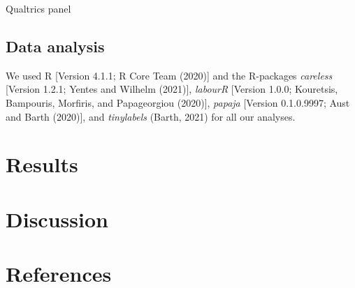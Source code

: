 \documentclass[
  english,
  man]{apa6}
\begin{document}
Qualtrics panel

\hypertarget{data-analysis}{%
\subsection{Data analysis}\label{data-analysis}}

We used R {[}Version 4.1.1; R Core Team (2020){]} and the R-packages \emph{careless} {[}Version 1.2.1; Yentes and Wilhelm (2021){]}, \emph{labourR} {[}Version 1.0.0; Kouretsis, Bampouris, Morfiris, and Papageorgiou (2020){]}, \emph{papaja} {[}Version 0.1.0.9997; Aust and Barth (2020){]}, and \emph{tinylabels} (Barth, 2021) for all our analyses.

\hypertarget{results-1}{%
\section{Results}\label{results-1}}

\hypertarget{discussion-1}{%
\section{Discussion}\label{discussion-1}}

\newpage

\hypertarget{references}{%
\section{References}\label{references}}

\begingroup
\setlength{\parindent}{-0.5in}
\setlength{\leftskip}{0.5in}
\end{document}
